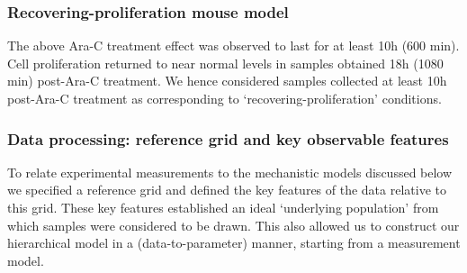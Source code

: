 \documentclass[10pt,letterpaper]{article}
\begin{document}
\subsubsection{Recovering-proliferation mouse
model}\label{recovering-proliferation-mouse-model}

The above Ara-C treatment effect was observed to last for at least 10h
(600 min). Cell proliferation returned to near normal levels in samples
obtained 18h (1080 min) post-Ara-C treatment. We hence considered
samples collected at least 10h post-Ara-C treatment as corresponding to
`recovering-proliferation' conditions.

\subsubsection{Data processing: reference grid and key observable
features}\label{data-processing-reference-grid-and-key-observable-features}

To relate experimental measurements to the mechanistic models discussed
below we specified a reference grid and defined the key features of the
data relative to this grid. These key features established an ideal
`underlying population' from which samples were considered to be drawn.
This also allowed us to construct our hierarchical model in a
(data-to-parameter) manner, starting from a measurement model.
\end{document}
